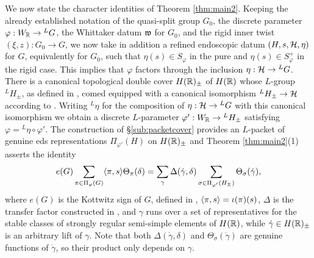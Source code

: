 \documentclass{article}
\theoremstyle{definition}
\numberwithin{equation}{section}
\renewcommand{\-}{\hyp{}}
\begin{document}
We now state the character identities of Theorem \ref{thm:main2}. Keeping the already established notation of the quasi-split group $G_0$, the discrete parameter $\varphi : W_{\mathbb{R}} \to {^LG}$, the Whittaker datum $\mathfrak{w}$ for $G_0$, and the rigid inner twist $(\xi,z) : G_0 \to G$, we now take in addition a refined endoscopic datum $(H,s,\mathcal{H},\eta)$ for $G$, equivalently for $G_0$, such that $\eta(s) \in S_\varphi$ in the pure and $\eta(s) \in S_\varphi^+$ in the rigid case. This implies that $\varphi$ factors through the inclusion $\eta : \mathcal{H} \to {^LG}$. There is a canonical topological double cover $H(\mathbb{R})_\pm$ of $H(\mathbb{R})$ whose $L$-group $^LH_\pm$, as defined in \cite[\S2.6]{KalHDC}, comed equipped with a canonical isomorphism $^LH_\pm \to \mathcal{H}$ according to \cite[\S3.1]{KalHDC}. Writing $^L\eta$ for the composition of $\eta : \mathcal{H} \to {^LG}$ with this canonical isomorphism we obtain a discrete $L$-parameter $\varphi' : W_{\mathbb{R}} \to {^LH_\pm}$ satisfying $\varphi = {^L\eta}\circ\varphi'$. The construction of \S\ref{sub:packetcover} provides an $L$-packet of genuine eds representations $\Pi_{\varphi'}(H)$ on $H(\mathbb{R})_\pm$ and Theorem \ref{thm:main2}(1) asserts the identity
\begin{equation} \label{eq:s4}
	e(G)\sum_{\pi \in \Pi_\varphi(G)}\langle\pi,s\rangle\Theta_\pi(\delta) = \sum_\gamma \Delta(\dot\gamma,\delta)\sum_{\sigma \in \Pi_{\varphi'}(H_\pm)} \Theta_{\sigma}(\dot\gamma),
\end{equation}
where $e(G)$ is the Kottwitz sign of $G$, defined in \cite{Kot83}, $\langle\pi,s\rangle=\iota(\pi)(s)$, $\Delta$ is the transfer factor constructed in \cite[\S4.3]{KalHDC}, and $\gamma$ runs over a set of representatives for the stable classes of strongly regular semi-simple elements of $H(\mathbb{R})$, while $\dot \gamma \in H(\mathbb{R})_\pm$ is an arbitrary lift of $\gamma$. Note that both $\Delta(\dot\gamma,\delta)$ and $\Theta_{\sigma}(\dot\gamma)$ are genuine functions of $\dot\gamma$, so their product only depends on $\gamma$.
\end{document}
